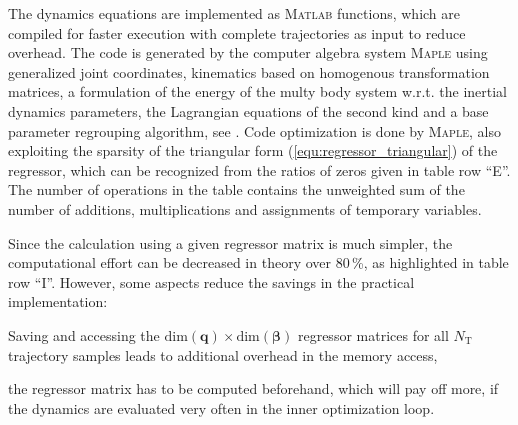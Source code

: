 \documentclass{svproc}
\newcommand{\bm}[1]{\boldsymbol{#1}}
\begin{document}
The dynamics equations are implemented as \textsc{Matlab} functions, which are compiled for faster execution with complete trajectories as input to reduce overhead.
The code is generated by the computer algebra system \textsc{Maple} using generalized joint coordinates, kinematics based on homogenous transformation matrices, a formulation of the energy of the multy body system w.r.t. the inertial dynamics parameters, the Lagrangian equations of the second kind and a base parameter regrouping algorithm, see \cite{KhalilDom2002}.
Code optimization is done by \textsc{Maple}, also exploiting the sparsity of the triangular form (\ref{equ:regressor_triangular}) of the regressor, which can be recognized from the ratios of zeros given in table row ``E''.
The number of operations in the table contains the unweighted sum of the number of additions, multiplications and assignments of temporary variables.

Since the calculation using a given regressor matrix is much simpler, the computational effort can be decreased in theory over 80\,\%, as highlighted in table row ``I''.
However, some aspects reduce the savings in the practical implementation:
\begin{compactitem} 
\item Saving and accessing the $\mathrm{dim}(\bm{q}) \times \mathrm{dim}(\bm{\beta})$ regressor matrices for all $N_\mathrm{T}$ trajectory samples leads to additional overhead in the memory access,
\item the regressor matrix has to be computed beforehand, which will pay off more, if the dynamics are evaluated very often in the inner optimization loop.
\end{compactitem}  

\end{document}
